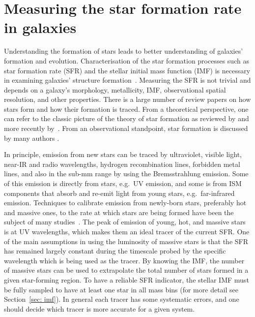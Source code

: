 
\section{Measuring the star formation rate in galaxies} 
\label{sec: sfr_intro}
Understanding the formation of stars leads to better understanding of galaxies' formation and evolution. 
Characterisation of the star formation processes such as star formation rate (SFR) and the stellar initial mass function (IMF) is necessary in examining galaxies' structure formation~\citep{McKee07}. 
Measuring the SFR is not trivial and depends on a galaxy's morphology, metallicity, IMF, observational spatial resolution, and other properties. 
There is a large number of review papers on how stars form and how their formation is traced. 
From a theoretical perspective, one can refer to the classic picture of the theory of star formation as reviewed by \cite{Shu87} and more recently by~\cite{McKee07}. 
From an observational standpoint, star formation is discussed by many authors \citep[e.g.][and references therein]{Kennicutt98b, Kewley02, Calzetti13, Boquien10, Kennicutt12}.

In principle, emission from new stars can be traced by ultraviolet, visible light, near-IR and radio wavelengths, hydrogen recombination lines, forbidden metal lines, and also in the sub-mm range by using the Bremsstrahlung emission. 
Some of this emission is directly from stars, e.g.\ UV emission, and some is from ISM components that absorb and re-emit light from young stars, e.g.\ far-infrared emission.
Techniques to calibrate emission from newly-born stars, preferably hot and massive ones, to the rate at which stars are being formed have been the subject of many studies~\citep[e.g.][]{Calzetti07, Kennicutt11, Hao11,Bigiel08}. 
The peak of emission of young, hot, and massive stars is at UV wavelengths, which makes them an ideal tracer of the current SFR.
One of the main assumptions in using the luminosity of massive stars is that the SFR has remained largely constant during the timescale probed by the specific wavelength which is being used as the tracer. 
By knowing the IMF, the number of massive stars can be used to extrapolate the total number of stars formed in a given star-forming region.
To have a reliable SFR indicator, the stellar IMF must be fully sampled to have at least one star in all mass bins (for more detail see Section~\ref{sec: imf}).
In general each tracer has some systematic errors, and one should decide which tracer is more accurate for a given system. 

